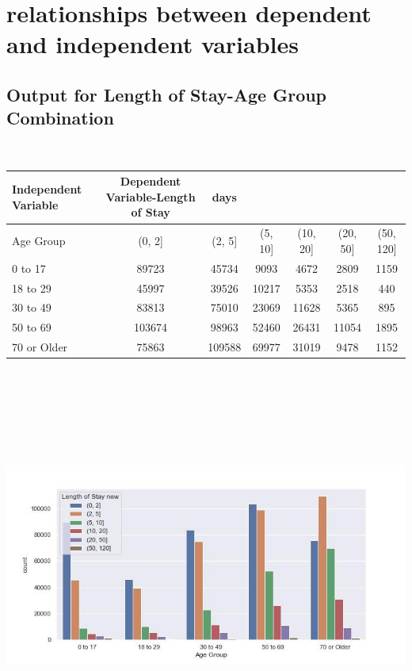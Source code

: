 \documentclass[
	letterpaper, %
]{jdf}
\begin{document}
\break
\section{relationships between dependent and independent variables}
\subsection{Output for Length of Stay-Age Group Combination}
\ 
\begin{jdftable}
\label{table:Example}
\small %
\begin{tabular}{@{} l c c c c c c}
\textbf{Independent Variable} & \textbf{Dependent Variable-Length of Stay} &\textbf{days} & & & \\
	\toprule[0.5pt]
	Age Group & (0, 2] & (2, 5] & (5, 10] & (10, 20] & (20, 50] & (50, 120] \\
\midrule
0 to 17 & 89723 & 45734 & 9093 & 4672 & 2809 & 1159 \\
\midrule
18 to 29 & 45997 & 39526 & 10217 & 5353 & 2518 & 440 \\
\midrule
30 to 49 & 83813 & 75010 & 23069 & 11628 & 5365 & 895 \\
\midrule
50 to 69 & 103674 & 98963 & 52460 & 26431 & 11054 & 1895 \\
\midrule
70 or Older & 75863 & 109588 & 69977 & 31019 & 9478 & 1152 \\
\end{tabular}
\end{jdftable}
\begin{jdffigure}
\includegraphics[height=13cm]{Figures/length-age.jpg} \\
\label{fig:length-age}%
\end{jdffigure}
\end{document}
